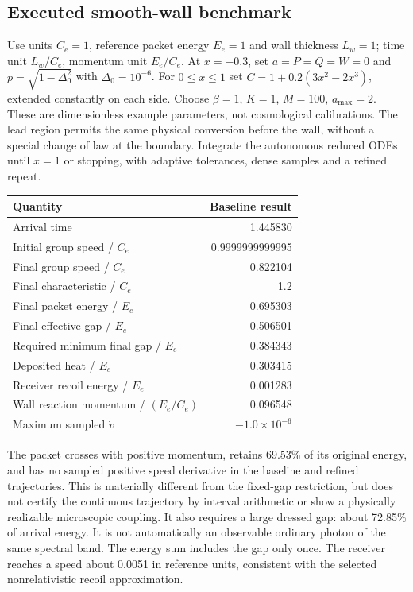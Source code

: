 \documentclass[
  11pt,
  twoside]{article}
\begin{document}
\subsection{Executed smooth-wall
benchmark}\label{executed-smooth-wall-benchmark}

Use units \(C_e=1\), reference packet energy \(E_e=1\) and wall
thickness \(L_w=1\); time unit \(L_w/C_e\), momentum unit \(E_e/C_e\).
At \(x=-0.3\), set \(a=P=Q=W=0\) and \(p=\sqrt{1-\Delta_0^2}\) with
\(\Delta_0=10^{-6}\). For \(0\leq x\leq1\) set \(C=1+0.2(3x^2-2x^3)\),
extended constantly on each side. Choose \(\beta=1\), \(K=1\),
\(M=100\), \(a_{\max}=2\). These are dimensionless example parameters,
not cosmological calibrations. The lead region permits the same physical
conversion before the wall, without a special change of law at the
boundary. Integrate the autonomous reduced ODEs until \(x=1\) or
stopping, with adaptive tolerances, dense samples and a refined repeat.

\begin{longtable}[]{@{}lr@{}}
\toprule\noalign{}
Quantity & Baseline result \\
\midrule\noalign{}
\endhead
\bottomrule\noalign{}
\endlastfoot
Arrival time & 1.445830 \\
Initial group speed / \(C_e\) & 0.9999999999995 \\
Final group speed / \(C_e\) & 0.822104 \\
Final characteristic / \(C_e\) & 1.2 \\
Final packet energy / \(E_e\) & 0.695303 \\
Final effective gap / \(E_e\) & 0.506501 \\
Required minimum final gap / \(E_e\) & 0.384343 \\
Deposited heat / \(E_e\) & 0.303415 \\
Receiver recoil energy / \(E_e\) & 0.001283 \\
Wall reaction momentum / \((E_e/C_e)\) & 0.096548 \\
Maximum sampled \(\dot v\) & \(-1.0\times10^{-6}\) \\
\end{longtable}

The packet crosses with positive momentum, retains 69.53\% of its
original energy, and has no sampled positive speed derivative in the
baseline and refined trajectories. This is materially different from the
fixed-gap restriction, but does not certify the continuous trajectory by
interval arithmetic or show a physically realizable microscopic
coupling. It also requires a large dressed gap: about 72.85\% of arrival
energy. It is not automatically an observable ordinary photon of the
same spectral band. The energy sum includes the gap only once. The
receiver reaches a speed about 0.0051 in reference units, consistent
with the selected nonrelativistic recoil approximation.
\end{document}
